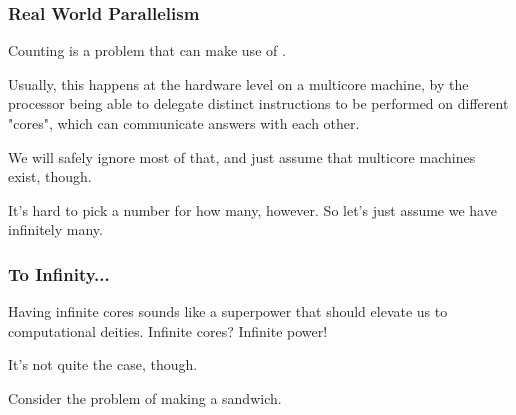 \documentclass[aspectratio=169, handout]{beamer}
\begin{document}
\begin{frame}[fragile]
  \frametitle{Real World Parallelism}

  Counting is a problem that can make use of .

  \pause
  \vspace{\fill}


  \pause
  \vspace{\fill}

  Usually, this happens at the hardware level on a multicore machine, by the processor being
  able to delegate distinct instructions to be performed on different "cores", which can
  communicate answers with each other. 

  \pause
  \vspace{\fill}
  
  We will safely ignore most of that, and just assume that multicore machines exist, though.

  \pause
  \vspace{\fill}
  
  It's hard to pick a number for how many, however. So let's just assume we have infinitely many.
\end{frame}

\begin{frame}[fragile]
  \frametitle{To Infinity...}

  Having infinite cores sounds like a superpower that should elevate us to computational deities.
  Infinite cores? Infinite power!

  \pause
  \vspace{\fill}

  It's not quite the case, though.

  \pause
  \vspace{\fill}

  Consider the problem of making a sandwich.
\end{frame}
\end{document}
